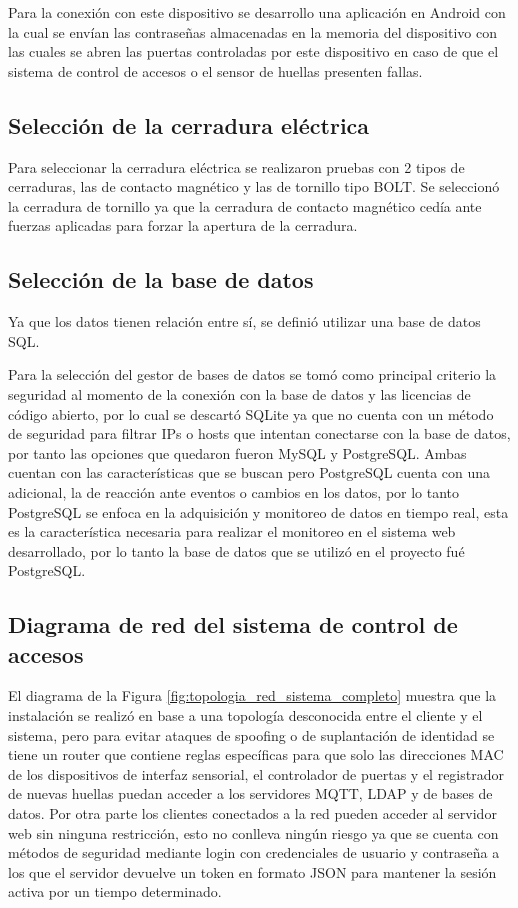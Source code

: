 \documentclass[../principal]{subfiles}
\begin{document}
  Para la conexión con este dispositivo se desarrollo una aplicación en Android con la cual se envían las contraseñas almacenadas en la memoria del dispositivo con las cuales se abren las puertas controladas por este dispositivo en caso de que el sistema de control de accesos o el sensor de huellas presenten fallas.

  \subsection{Selección de la cerradura eléctrica}

  Para seleccionar la cerradura eléctrica se realizaron pruebas con 2 tipos de cerraduras, las de contacto magnético y las de tornillo tipo BOLT. Se seleccionó la cerradura de tornillo ya que la cerradura de contacto magnético cedía ante fuerzas aplicadas para forzar la apertura de la cerradura.

  \subsection{Selección de la base de datos}

  Ya que los datos tienen relación entre sí, se definió utilizar una base de datos SQL.
  
  Para la selección del gestor de bases de datos se tomó como principal criterio la seguridad al momento de la conexión con la base de datos y las licencias de código abierto, por lo cual se descartó SQLite ya que no cuenta con un método de seguridad para filtrar IPs o hosts que intentan conectarse con la base de datos, por tanto las opciones que quedaron fueron MySQL y PostgreSQL. Ambas cuentan con las características que se buscan pero PostgreSQL cuenta con una adicional, la de reacción ante eventos o cambios en los datos, por lo tanto PostgreSQL se enfoca en la adquisición y monitoreo de datos en tiempo real, esta es la característica necesaria para realizar el monitoreo en el sistema web desarrollado, por lo tanto la base de datos que se utilizó en el proyecto fué PostgreSQL.

  \subsection{Diagrama de red del sistema de control de accesos}

  El diagrama de la Figura \ref{fig:topologia_red_sistema_completo} muestra que la instalación se realizó en base a una topología desconocida entre el cliente y el sistema, pero para evitar ataques de spoofing o de suplantación de identidad se tiene un router que contiene reglas específicas para que solo las direcciones MAC de los dispositivos de interfaz sensorial, el controlador de puertas y el registrador de nuevas huellas puedan acceder a los servidores MQTT, LDAP y de bases de datos. Por otra parte los clientes conectados a la red pueden acceder al servidor web sin ninguna restricción, esto no conlleva ningún riesgo ya que se cuenta con métodos de seguridad mediante login con credenciales de usuario y contraseña a los que el servidor devuelve un token en formato JSON para mantener la sesión activa por un tiempo determinado.
\end{document}
